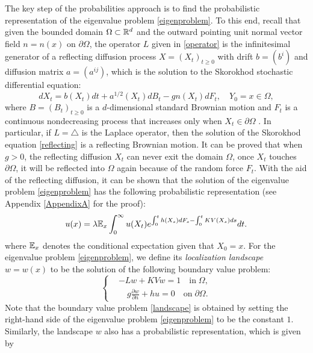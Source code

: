\documentclass[a4paper,11pt]{article}
\begin{document}
The key step of the probabilities approach is to find the probabilistic representation of the eigenvalue problem \eqref{eigenproblem}. To this end, recall that given the bounded domain $\Omega \subset \mathbb{R}^d$ and the outward pointing unit normal vector field $n = n(x)$ on $\partial \Omega$, the operator $L$ given in \eqref{operator} is the infinitesimal generator of a reflecting diffusion process $X = (X_t)_{t \geq 0}$ with drift $b = (b^i)$ and diffusion matrix $a = (a^{ij})$, which is the solution to the Skorokhod stochastic differential equation:
\begin{equation}\label{reflecting}
dX_t = b(X_t) dt + a^{1/2}(X_t) d B_t - g n(X_t) d F_t, \quad Y_0 = x\in\Omega,
\end{equation}
where $B = (B_t)_{t\geq 0}$ is a $d$-dimensional standard Brownian motion and $F_t$ is a continuous nondecreasing process that increases only when $X_t \in \partial \Omega$ \cite{1998Diffusions}. In particular, if $L = \triangle$ is the Laplace operator, then the solution of the Skorokhod equation \eqref{reflecting} is a reflecting Brownian motion. It can be proved that when $g > 0$, the reflecting diffusion $X_t$ can never exit the domain $\Omega$, once $X_t$ touches $\partial \Omega$, it will be reflected into $\Omega$ again because of the random force $F_t$. With the aid of the reflecting diffusion, it can be shown that the solution of the eigenvalue problem \eqref{eigenproblem} has the following probabilistic representation (see Appendix \ref{AppendixA} for the proof):
\begin{equation}\label{probeigen}
u(x) = \lambda \mathbb{E}_x \int_{0}^{\infty} u(X_t) e^{\int_{0}^{t} h(X_s) d F_s - \int_{0}^{t} K V(X_s) ds} dt.
\end{equation}
where $\mathbb{E}_x$ denotes the conditional expectation given that $X_0 = x$. For the eigenvalue problem \eqref{eigenproblem}, we define its \emph{localization landscape} $w = w(x)$ to be the solution of the following boundary value problem:
\begin{equation}\label{landscape}
\left\{
\begin{split}
& - L w + K V w = 1 \quad \textrm{in} \; \Omega, \\
& \quad g \frac{\partial w}{\partial n} + h u = 0 \quad \textrm{on} \; \partial \Omega.
\end{split}
\right.
\end{equation}
Note that the boundary value problem \eqref{landscape} is obtained by setting the right-hand side of the eigenvalue problem \eqref{eigenproblem} to be the constant $1$. Similarly, the landscape $w$ also has a probabilistic representation, which is given by
\end{document}

